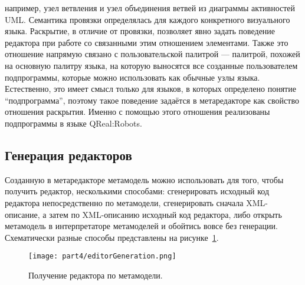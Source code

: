 \begin{enumerate}
		например, узел ветвления и узел объединения ветвей из диаграммы активностей UML. 
		Семантика провязки определялась для каждого конкретного визуального языка. Раскрытие, 
		в отличие от провязки, позволяет явно задать поведение редактора при работе со 
		связанными этим отношением элементами. Также это отношение напрямую связано с 
		пользовательской палитрой --- палитрой, похожей на основную палитру языка, на 
		которую выносятся все созданные пользователем подпрограммы, которые можно использовать 
		как обычные узлы языка. Естественно, это имеет смысл только для языков, в которых 
		определено понятие "`подпрограмма"', поэтому такое поведение задаётся в метаредакторе 
		как свойство отношения раскрытия. Именно с помощью этого отношения реализованы 
		подпрограммы в языке QReal:Robots.
\end{enumerate}

\subsection{Генерация редакторов}
Созданную в метаредакторе метамодель можно использовать для того, чтобы получить редактор, 
несколькими способами: сгенерировать исходный код редактора непосредственно по метамодели, 
сгенерировать сначала XML-описание, а затем по XML-описанию исходный код редактора, 
либо открыть метамодель в интерпретаторе метамоделей и обойтись вовсе без генерации. 
Схематически разные способы представлены на рисунке~\ref{image:editorGeneration}.

\begin{figure} [ht]
	\begin{center}
		\texttt{[image: part4/editorGeneration.png]}
		\caption{Получение редактора по метамодели.}
		\label{image:editorGeneration}
	\end{center}
\end{figure}

